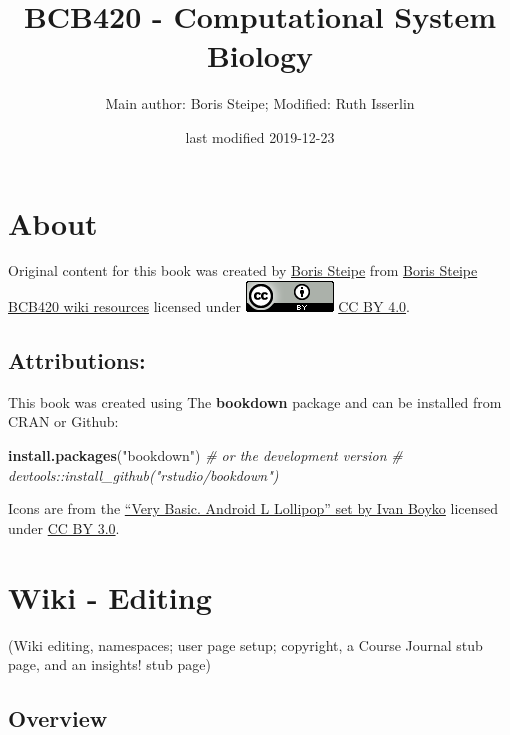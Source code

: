 \documentclass[]{book}
\title{BCB420 - Computational System Biology}
\author{Main author: Boris Steipe; Modified: Ruth Isserlin}
\date{last modified 2019-12-23}
\newenvironment{Shaded}{\begin{snugshade}}{\end{snugshade}}
\newcommand{\KeywordTok}[1]{\textcolor[rgb]{0.13,0.29,0.53}{\textbf{#1}}}
\newcommand{\StringTok}[1]{\textcolor[rgb]{0.31,0.60,0.02}{#1}}
\newcommand{\CommentTok}[1]{\textcolor[rgb]{0.56,0.35,0.01}{\textit{#1}}}
\newcommand{\NormalTok}[1]{#1}
\begin{document}
\maketitle

{
\setcounter{tocdepth}{1}
\tableofcontents
}
\chapter{About}\label{about}

Original content for this book was created by
\href{http://biochemistry.utoronto.ca/person/boris-steipe/}{Boris
Steipe} from
\href{http://steipe.biochemistry.utoronto.ca/abc/index.php/Computational_Systems_Biology_Main_Page}{Boris
Steipe BCB420 wiki resources} licensed under
\includegraphics{images/cc_icon.png}
\href{https://creativecommons.org/licenses/by/4.0/}{CC BY 4.0}.

\section{Attributions:}\label{attributions}

This book was created using The \textbf{bookdown} package and can be
installed from CRAN or Github:

\begin{Shaded}
\begin{Highlighting}[]
\KeywordTok{install.packages}\NormalTok{(}\StringTok{"bookdown"}\NormalTok{)}
\CommentTok{# or the development version}
\CommentTok{# devtools::install_github("rstudio/bookdown")}
\end{Highlighting}
\end{Shaded}

Icons are from the
\href{https://www.iconfinder.com/iconsets/very-basic-android-l-lollipop}{``Very
Basic. Android L Lollipop'' set by Ivan Boyko} licensed under
\href{https://creativecommons.org/licenses/by/3.0/}{CC BY 3.0}.

\hypertarget{wiki}{\chapter{Wiki - Editing}\label{wiki}}

(Wiki editing, namespaces; user page setup; copyright, a Course Journal
stub page, and an insights! stub page)

\section{Overview}\label{overview}
\end{document}
